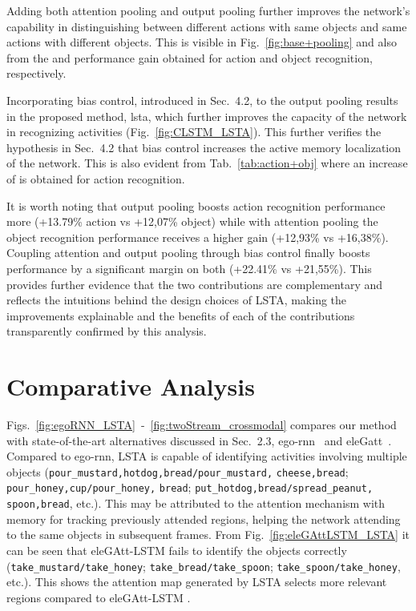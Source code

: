 \documentclass[10pt,twocolumn,letterpaper]{article}
\begin{document}
\begin{matrix*}[r]
Adding both attention pooling and output pooling further improves the network's capability in distinguishing between different actions with same objects and same actions with different objects. This is visible in Fig.~\ref{fig:base+pooling} and also from the  and  performance gain obtained for action and object recognition, respectively. 

Incorporating bias control, introduced in Sec.~4.2, to the output pooling results in the proposed method, \acs{lsta}, which further improves the capacity of the network in recognizing activities (Fig.~\ref{fig:CLSTM_LSTA}). This further verifies the hypothesis in Sec.~4.2 that bias control increases the active memory localization of the network. This is also evident from Tab.~\ref{tab:action+obj} where an increase of  is obtained for action recognition.


It is worth noting that output pooling boosts action recognition performance more (+13.79\% action vs +12,07\% object) while with attention pooling the object recognition performance receives a higher gain (+12,93\% vs +16,38\%). Coupling attention and output pooling through bias control finally boosts performance by a significant margin on both (+22.41\% vs +21,55\%).
This provides further evidence that the two contributions are complementary and reflects the intuitions behind the design choices of LSTA, making the improvements explainable and the benefits of each of the contributions transparently confirmed by this analysis.






	\section{Comparative Analysis}
	
	Figs.~\ref{fig:egoRNN_LSTA}~-~\ref{fig:twoStream_crossmodal} compares our method with state-of-the-art alternatives discussed in Sec.~2.3, ego-rnn~\cite{sudhakaran2018attention} and eleGatt~\cite{attention_eccv18}. Compared to ego-rnn, LSTA is capable of identifying activities involving multiple objects (\verb+pour_mustard,hotdog,bread/pour_mustard,+ \verb+cheese,bread+; \verb+pour_honey,cup/pour_honey,+ \verb+bread+; \verb+put_hotdog,bread/spread_peanut,+ \verb+spoon,bread+, etc.). This may be attributed to the attention mechanism with memory for tracking previously attended regions, helping the network attending to the same objects in subsequent frames. From Fig.~\ref{fig:eleGAttLSTM_LSTA} it can be seen that eleGAtt-LSTM fails to identify the objects correctly (\verb+take_mustard/take_honey+; \verb+take_bread/take_spoon+; \verb+take_spoon/take_honey+, etc.). This shows the attention map generated by LSTA selects more relevant regions compared to eleGAtt-LSTM .
	


\end{matrix*}
\end{document}
